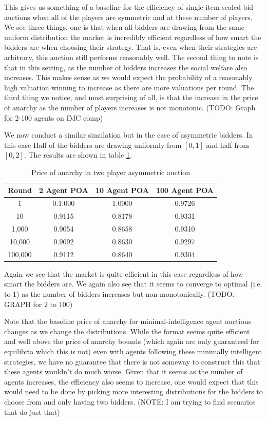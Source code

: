 \documentclass[12pt,twoside]{reedthesis}
\begin{document}
This gives us something of a baseline for the efficiency of single-item sealed bid auctions when all of the players are symmetric and at these number of players. We see three things, one is that when all bidders are drawing from the same uniform distribution the market is incredibly efficient regardless of how smart the bidders are when choosing their strategy. That is, even when their strategies are arbitrary, this auction still performs reasonably well. The second thing to note is that in this setting, as the number of bidders increases the social welfare also increases. This makes sense as we would expect the probability of a reasonably high valuation winning to increase as there are  more valuations per round. The third thing we notice, and most surprising of all, is that the increase in the price of anarchy as the number of players increases is not monotonic. (TODO: Graph for 2-100 agents on IMC comp)

We now conduct a similar simulation but in the case of asymmetric bidders. In this case Half of the bidders are drawing uniformly from $[0,1]$ and half from $[0,2]$. The results are shown in table \ref{table:zero_int_asymmetric}. 

\begin{table}[h!]
	\begin{center}
		\begin{tabular}{ |c|c|c|c| }
			\hline
			Round & 2 Agent POA & 10 Agent POA & 100 Agent POA \\
			\hline
			1 & 0.1.000 & 1.0000 & 0.9726\\
			10 & 0.9115 & 0.8178 & 0.9331\\
			1,000 & 0.9054 & 0.8658 & 0.9310\\
			10,000 & 0.9092 & 0.8630 & 0.9297\\
			100,000 & 0.9112 & 0.8640 & 0.9304\\
			\hline
		\end{tabular}
		\caption{Price of anarchy in two player asymmetric auction}
		\label{table:zero_int_asymmetric}
	\end{center} 
\end{table}

Again we see that the market is quite efficient in this case regardless of how smart the bidders are. We again also see that it seems to converge to optimal (i.e. to 1) as the number of bidders increases but non-monotonically. (TODO: GRAPH for 2 to 100)

Note that the baseline price of anarchy for minimal-intelligence agent auctions changes as we change the distributions. While the format seems quite efficient and well above the price of anarchy bounds (which again are only guaranteed for equilibria which this is not) even with agents following these minimally intelligent strategies, we have no guarantee that there is not someway to construct this that these agents wouldn't do much worse. Given that it seems as the number of agents increases, the efficiency also seems to increase, one would expect that this would need to be done by picking more interesting distributions for the bidders to choose from and only having two bidders. (NOTE: I am trying to find scenarios that do just that)
\end{document}
